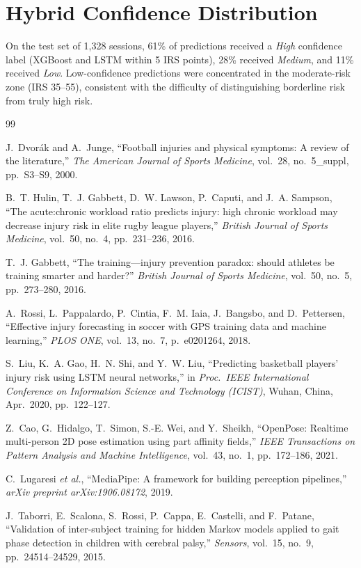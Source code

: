 \documentclass[12pt,a4paper]{report}
\begin{document}
\section{Hybrid Confidence Distribution}

On the test set of 1,328 sessions, 61\% of predictions received a \textit{High} confidence label (XGBoost and LSTM within 5 IRS points), 28\% received \textit{Medium}, and 11\% received \textit{Low}. Low-confidence predictions were concentrated in the moderate-risk zone (IRS 35--55), consistent with the difficulty of distinguishing borderline risk from truly high risk.

\clearpage


\begin{thebibliography}{99}

  J.~Dvor\'{a}k and A.~Junge,
  ``Football injuries and physical symptoms: A review of the literature,''
  \emph{The American Journal of Sports Medicine}, vol.~28, no.~5\_suppl, pp.~S3--S9, 2000.

  B.~T. Hulin, T.~J. Gabbett, D.~W. Lawson, P.~Caputi, and J.~A. Sampson,
  ``The acute:chronic workload ratio predicts injury: high chronic workload
  may decrease injury risk in elite rugby league players,''
  \emph{British Journal of Sports Medicine}, vol.~50, no.~4, pp.~231--236, 2016.

  T.~J. Gabbett,
  ``The training—injury prevention paradox: should athletes be training smarter
  and harder?''
  \emph{British Journal of Sports Medicine}, vol.~50, no.~5, pp.~273--280, 2016.

  A.~Rossi, L.~Pappalardo, P.~Cintia, F.~M. Iaia, J.~Bangsbo, and D.~Pettersen,
  ``Effective injury forecasting in soccer with GPS training data and machine
  learning,''
  \emph{PLOS ONE}, vol.~13, no.~7, p.~e0201264, 2018.

  S.~Liu, K.~A. Gao, H.~N. Shi, and Y.~W. Liu,
  ``Predicting basketball players' injury risk using LSTM neural networks,''
  in \emph{Proc.\ IEEE International Conference on Information Science and
  Technology (ICIST)}, Wuhan, China, Apr.\ 2020, pp.~122--127.

  Z.~Cao, G.~Hidalgo, T.~Simon, S.-E. Wei, and Y.~Sheikh,
  ``OpenPose: Realtime multi-person 2D pose estimation using part affinity
  fields,''
  \emph{IEEE Transactions on Pattern Analysis and Machine Intelligence},
  vol.~43, no.~1, pp.~172--186, 2021.

  C.~Lugaresi \textit{et al.},
  ``MediaPipe: A framework for building perception pipelines,''
  \emph{arXiv preprint arXiv:1906.08172}, 2019.

  J.~Taborri, E.~Scalona, S.~Rossi, P.~Cappa, E.~Castelli, and F.~Patane,
  ``Validation of inter-subject training for hidden Markov models applied to
  gait phase detection in children with cerebral palsy,''
  \emph{Sensors}, vol.~15, no.~9, pp.~24514--24529, 2015.

\end{thebibliography}
\end{document}
